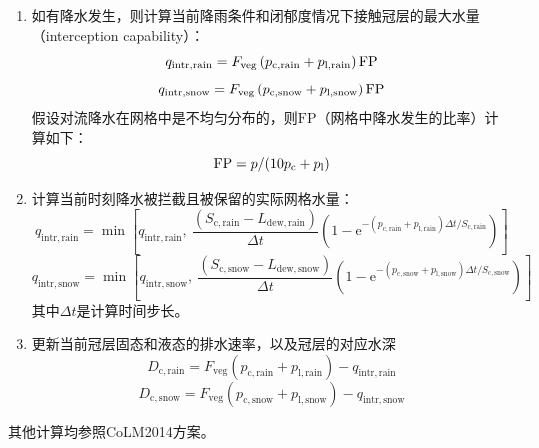 \begin{enumerate}
\item 如有降水发生，则计算当前降雨条件和闭郁度情况下接触冠层的最大水量（interception capability）：
  \begin{equation}
    q_{\mathrm{intr,rain}} =F_{\mathrm{veg}}\left(p_{\mathrm{c,rain}}+p_{\mathrm{l,rain}}\right) {\rm FP}
  \end{equation}
  \begin{equation}
    q_{\mathrm{intr,snow}} =F_{\mathrm{veg}}\left(p_{\mathrm{c,snow}}+p_{\mathrm{l,snow}}\right) {\rm FP}
  \end{equation}
  假设对流降水在网格中是不均匀分布的，则${\mathrm {FP}}$（网格中降水发生的比率）计算如下：
  \begin{equation}
    {\rm FP} = p/ (10p_{\mathrm{c}} + p_{\mathrm{l}})
  \end{equation}
\item 计算当前时刻降水被拦截且被保留的实际网格水量：
  \begin{equation}
    q_{\mathrm{intr,rain}} = \min\left[q_{\mathrm{intr,rain}}, \ \frac{(S_{\mathrm{c,rain}} - L_{\mathrm{dew,rain}})}{\Delta{t}}  (1-{\mathrm e}^{-\left(p_{\mathrm{c,rain}}+p_{\mathrm{l,rain}}\right)\Delta{t}/S_{\mathrm{c,rain}}})\right]
  \end{equation}
  \begin{equation}
    q_{\mathrm{intr,snow}} = \min\left[q_{\mathrm{intr,snow}},\ \frac{(S_{\mathrm{c,snow}} - L_{\mathrm{dew,snow}})}{\Delta{t}} (1-{\mathrm e}^{-\left(p_{\mathrm{c,snow}}+p_{\mathrm{l,snow}}\right)\Delta{t}/S_{\mathrm{c,snow}}})\right]
  \end{equation}
  其中${\Delta{t}}$是计算时间步长。
\item 更新当前冠层固态和液态的排水速率，以及冠层的对应水深
  \begin{equation}
    D_{\mathrm{c,rain}}=F_{\mathrm{veg}}  (p_{\mathrm{c,rain}}+p_{\mathrm{l,rain}})-q_{\mathrm{intr,rain}}
  \end{equation}
  \begin{equation}
    D_{\mathrm{c,snow}}=F_{\mathrm{veg}}  (p_{\mathrm{c,snow}}+p_{\mathrm{l,snow}})-q_{\mathrm{intr,snow}}
  \end{equation}
\end{enumerate}
其他计算均参照CoLM2014方案。


